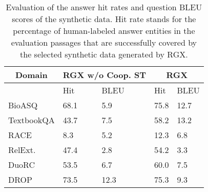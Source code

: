 \documentclass[11pt,a4paper]{article}
\begin{document}
\begin{table}[]
\small
\centering
\begin{tabular}{@{}lllll@{}}
\toprule
\multicolumn{1}{c}{\textbf{Domain}} & \multicolumn{2}{c}{\textbf{RGX w/o Coop. ST}} & \multicolumn{2}{c}{\textbf{RGX}} \\ \midrule
                           & Hit        & BLEU      & Hit         & BLEU        \\ \hdashline[1.5pt/2pt]
BioASQ                     & 68.1       & 5.9      & 75.8         & 12.7        \\
TextbookQA                 & 43.7       & 7.5      & 58.2         & 13.2        \\
RACE                       & 8.3        & 5.2      & 12.3         & 6.8         \\
RelExt.                         & 47.4        & 2.8       & 54.2         & 3.3         \\
DuoRC                      & 53.5       & 6.7          & 60.0         & 7.5            \\
DROP                       & 73.5       & 12.3          & 75.3        & 9.3            \\ \bottomrule
\end{tabular}
\caption{Evaluation of the answer hit rates and question BLEU scores of the synthetic data. Hit rate stands for the percentage of human-labeled answer entities in the evaluation passages that are successfully covered by the selected synthetic data generated by RGX.}
\label{tab:syn-eval}
\end{table}
\end{document}
